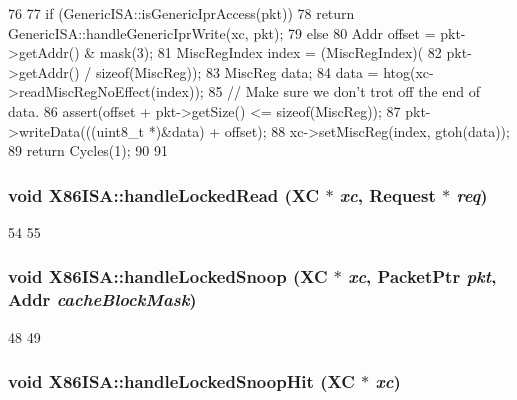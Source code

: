 \begin{DoxyCode}
76     {
77         if (GenericISA::isGenericIprAccess(pkt)) {
78             return GenericISA::handleGenericIprWrite(xc, pkt);
79         } else {
80             Addr offset = pkt->getAddr() & mask(3);
81             MiscRegIndex index = (MiscRegIndex)(
82                 pkt->getAddr() / sizeof(MiscReg));
83             MiscReg data;
84             data = htog(xc->readMiscRegNoEffect(index));
85             // Make sure we don't trot off the end of data.
86             assert(offset + pkt->getSize() <= sizeof(MiscReg));
87             pkt->writeData(((uint8_t *)&data) + offset);
88             xc->setMiscReg(index, gtoh(data));
89             return Cycles(1);
90         }
91     }
\end{DoxyCode}
\hypertarget{namespaceX86ISA_ae25812b653903deff64ba9ec77bbb621}{
\subsubsection[{handleLockedRead}]{\setlength{\rightskip}{0pt plus 5cm}void X86ISA::handleLockedRead (XC $\ast$ {\em xc}, \/  {\bf Request} $\ast$ {\em req})}}
\label{namespaceX86ISA_ae25812b653903deff64ba9ec77bbb621}



\begin{DoxyCode}
54     {
55     }
\end{DoxyCode}
\hypertarget{namespaceX86ISA_acda735ab07a398b2f35ba3812e5b389a}{
\subsubsection[{handleLockedSnoop}]{\setlength{\rightskip}{0pt plus 5cm}void X86ISA::handleLockedSnoop (XC $\ast$ {\em xc}, \/  {\bf PacketPtr} {\em pkt}, \/  {\bf Addr} {\em cacheBlockMask})}}
\label{namespaceX86ISA_acda735ab07a398b2f35ba3812e5b389a}



\begin{DoxyCode}
48     {
49     }
\end{DoxyCode}
\hypertarget{namespaceX86ISA_ad398093a88ab6b5d6d11b250b3fe796f}{
\subsubsection[{handleLockedSnoopHit}]{\setlength{\rightskip}{0pt plus 5cm}void X86ISA::handleLockedSnoopHit (XC $\ast$ {\em xc})}}
\label{namespaceX86ISA_ad398093a88ab6b5d6d11b250b3fe796f}



